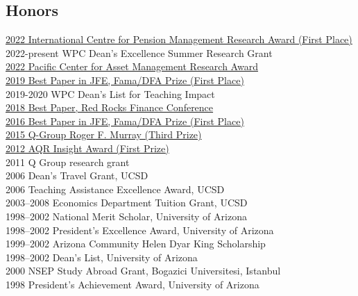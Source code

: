 \documentclass[margin,line,12pt]{res}
\newcommand{\webhide}{}
\begin{document}
\begin{resume}
\section{\sc\small Honors}
\href{https://icpmnetwork.com/site/research/call-for-research}{2022 International Centre for Pension Management Research Award (First Place)}\\
2022-present WPC Dean's Excellence Summer Research Grant\webhide\\
\href{https://rady.ucsd.edu/centers/pcam/research/}{2022 Pacific Center for Asset Management Research Award}\\
\href{https://www.jfinec.com/fama-dfa-prize}{2019 Best Paper in JFE, Fama/DFA Prize (First Place)}\\
2019-2020 WPC Dean's List for Teaching Impact\webhide\\
\href{https://marriottschool.byu.edu/event/redrock2018/home}{2018 Best Paper, Red Rocks Finance Conference}\\
\href{https://www.jfinec.com/fama-dfa-prize}{2016 Best Paper in JFE, Fama/DFA Prize (First Place)}\\
\href{https://www.q-group.org/Roger-F.Murray-Prize}{2015 Q-Group Roger F. Murray (Third Prize)}\\
\href{https://www.aqr.com/About-Us/AQR-Insight-Award/2012/First-Prize}{2012 AQR Insight Award (First Prize)}\\
2011 Q Group research grant\\
2006 Dean's Travel Grant, UCSD\webhide\\
2006 Teaching Assistance Excellence Award, UCSD\webhide\\
2003--2008 Economics Department Tuition Grant, UCSD\webhide\\
1998--2002 National Merit Scholar, University of Arizona \\
1998--2002 President's Excellence Award, University of Arizona\webhide\\
1999--2002 Arizona Community Helen Dyar King Scholarship\webhide\\
1998--2002 Dean's List, University of Arizona\webhide\\
2000 NSEP Study Abroad Grant, Bogazici Universitesi, Istanbul\webhide\\
1998 President's Achievement Award, University of Arizona\webhide


\end{resume}
\end{document}
